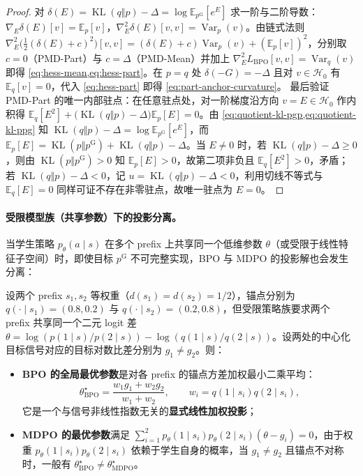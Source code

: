 \documentclass[lang=cn,scheme=chinese,openany]{../book/elegantbook}
\newcommand{\E}{\mathbb E}
\newcommand{\KL}{\operatorname{KL}}
\newcommand{\Var}{\operatorname{Var}}
\begin{document}
\begin{proof}
对 $\delta(E)=\KL(q\Vert p)-\Delta=\log\E_{p^{\mathrm G}}[e^E]$ 求一阶与二阶导数：$\nabla_E\delta(E)[v]=\E_p[v]$，$\nabla^2_E\delta(E)[v,v]=\Var_p(v)$。由链式法则 $\nabla^2_E\bigl(\frac12(\delta(E)+c)^2\bigr)[v,v]=(\delta(E)+c)\Var_p(v)+(\E_p[v])^2$，分别取 $c=0$（PMD-Part）与 $c=\Delta$（PMD-Mean）并加上 $\nabla^2_E L_{\mathrm{BPO}}[v,v]=\Var_q(v)$ 即得 \cref{eq:hess-mean,eq:hess-part}。在 $p=q$ 处 $\delta(-G)=-\Delta$ 且对 $v\in\mathcal H_0$ 有 $\E_q[v]=0$，代入 \cref{eq:hess-part} 即得 \cref{eq:part-anchor-curvature}。
最后验证 PMD-Part 的唯一内部驻点：在任意驻点处，对一阶梯度沿方向 $v=E\in\mathcal H_0$ 作内积得 $\E_q[E^2]+\bigl(\KL(q\Vert p)-\Delta\bigr)\E_p[E]=0$。由 \cref{eq:quotient-kl-pgp,eq:quotient-kl-ppg} 知 $\KL(q\Vert p)-\Delta=\log\E_{p^{\mathrm G}}[e^E]$，而 $\E_p[E]=\KL(p\Vert p^{\mathrm G})+\KL(q\Vert p)-\Delta$。当 $E\ne 0$ 时，若 $\KL(q\Vert p)-\Delta\ge 0$，则由 $\KL(p\Vert p^{\mathrm G})>0$ 知 $\E_p[E]>0$，故第二项非负且 $\E_q[E^2]>0$，矛盾；若 $\KL(q\Vert p)-\Delta<0$，记 $u=\KL(q\Vert p)-\Delta<0$，利用切线不等式与 $\E_q[E]=0$ 同样可证不存在非零驻点，故唯一驻点为 $E=0$。
\end{proof}

\paragraph{受限模型族（共享参数）下的投影分离。}
当学生策略 $p_\theta(a\mid s)$ 在多个 prefix 上共享同一个低维参数 $\theta$（或受限于线性特征子空间）时，即使目标 $p^{\mathrm G}$ 不可完整实现，BPO 与 MDPO 的投影解也会发生分离：
\begin{proposition}
\label{ex:shared-logits-separation}
设两个 prefix $s_1,s_2$ 等权重（$d(s_1)=d(s_2)=1/2$），锚点分别为 $q(\cdot\mid s_1)=(0.8,0.2)$ 与 $q(\cdot\mid s_2)=(0.2,0.8)$，但受限策略族要求两个 prefix 共享同一个二元 logit 差 $\theta=\log(p(1\mid s)/p(2\mid s))-\log(q(1\mid s)/q(2\mid s))$。设两处的中心化目标信号对应的目标对数比差分别为 $g_1\ne g_2$。则：
\begin{itemize}
 \item \textbf{BPO 的全局最优参数}是对各 prefix 的锚点方差加权最小二乘平均：
 \begin{equation}
  \theta_{\mathrm{BPO}}^\star = \frac{w_1 g_1 + w_2 g_2}{w_1 + w_2},
  \qquad w_i = q(1\mid s_i)q(2\mid s_i),
 \end{equation}
 它是一个与信号非线性指数无关的\textbf{显式线性加权投影}；
 \item \textbf{MDPO 的最优参数}满足 $\sum_{i=1}^2 p_{\theta}(1\mid s_i)p_{\theta}(2\mid s_i)(\theta-g_i)=0$，由于权重 $p_\theta(1\mid s_i)p_\theta(2\mid s_i)$ 依赖于学生自身的概率，当 $g_1\ne g_2$ 且锚点不对称时，一般有 $\theta_{\mathrm{BPO}}^\star\ne \theta_{\mathrm{MDPO}}^\star$。
\end{itemize}
\end{proposition}
\end{document}
